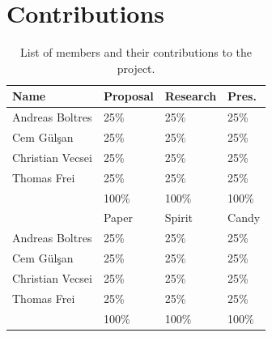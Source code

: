 \documentclass[10pt,twocolumn,letterpaper]{article}
\begin{document}

\section*{Contributions}
\label{sec:contrib}

\begin{table}[H]
\centering
\begin{tabular}{l|l l l} \hline
		Name & Proposal & Research & Pres.\\ \hline
		Andreas Boltres & 25\% & 25\% & 25\% \\
		Cem G\"ul\c{s}an & 25\% & 25\% & 25\% \\
		Christian Vecsei & 25\% & 25\% & 25\% \\
		Thomas Frei & 25\% & 25\% & 25\%  \\ \hline
		& 100\% & 100\% & 100\% \\ \hline \hline
		     & Paper & Spirit & Candy\\ \hline
		Andreas Boltres & 25\% & 25\% & 25\% \\
		Cem G\"ul\c{s}an & 25\% & 25\% & 25\% \\
		Christian Vecsei & 25\% & 25\% & 25\% \\
		Thomas Frei & 25\% & 25\% & 25\% \\ \hline
		& 100\% & 100\% & 100\% \\ \hline
\end{tabular}
\caption{List of members and their contributions to the project.}
\label{tab:contrib}
\end{table}
\end{document}

